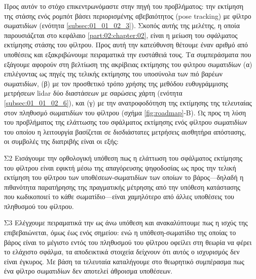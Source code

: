 Προς αυτόν το στόχο επικεντρωνόμαστε στην πηγή του προβλήματος: την εκτίμηση
της στάσης ενός ρομπότ βάσει περιορισμένης αβεβαιότητος (pose tracking) με
φίλτρο σωματιδίων (ενότητα \ref{subsec:01_01_02_3}). Σκοπός αυτής της μελέτης, η
οποία παρουσιάζεται στο κεφάλαιο \ref{part:02:chapter:02}, είναι η μείωση του
σφάλματος εκτίμησης στάσης του φίλτρου. Προς αυτή την κατεύθυνση θέτουμε έναν
αριθμό από υποθέσεις και εξακριβώνουμε πειραματικά την ευστάθειά τους. Τα
συμπεράσματα που εξάγουμε αφορούν στη βελτίωση της ακρίβειας εκτίμησης του
φιλτρου σωματιδίων (α) επιλέγοντας ως πηγές της τελικής εκτίμησης του υποσύνολα
των πιό βαρέων σωματιδίων, (β) με τον προσθετικό τρόπο χρήσης της μεθόδου
ευθυγράμμισης μετρήσεων lidar δύο διαστάσεων με σαρώσεις χάρτη (ενότητα
\ref{subsec:01_01_02_6}), και (γ) με την ανατροφοδότηση της εκτίμησης της
τελευταίας στον πληθυσμό σωματιδίων του φίλτρου (σχήμα \ref{fig:roadmap}-Β). Ως
προς τη λύση του προβλήματος της ελάττωσης του σφάλματος εκτίμησης ενός φίλτρου
σωματιδίων του οποίου η λειτουργία βασίζεται σε δισδιάστατες μετρήσεις
αισθητήρα απόστασης, οι συμβολές της διατριβής είναι οι εξής:

\begin{bw_box}
\begin{customcontribution}{Σ2}
  \label{contribution:02}
  Εισάγουμε την ορθολογική υπόθεση πως η ελάττωση του σφάλματος εκτίμησης του
  φίλτρου είναι εφικτή μέσω της απαγόρευσης ψηφοδοσίας ως προς την τελική
  εκτίμηση του φίλτρου των υποθέσεων-σωματιδίων των οποίων το βάρος---δηλαδή η
  πιθανότητα παρατήρησης της πραγματικής μέτρησης από την υπόθεση κατάστασης
  που κωδικοποιεί το κάθε σωματίδιο---είναι χαμηλότερο από άλλες υποθέσεις του
  πληθυσμού του φίλτρου. \cite{Filotheou2020c}
\end{customcontribution}
\end{bw_box}

\begin{bw_box}
\begin{customcontribution}{Σ3}
  \label{contribution:03}
  Ελέγχουμε πειραματικά την ως άνω υπόθεση και ανακαλύπτουμε πως η ισχύς της
  επιβεβαιώνεται, όμως έως ενός σημείου: ενώ η υπόθεση-σωματίδιο της οποίας το
  βάρος είναι το μέγιστο εντός του πληθυσμού του φίλτρου οφείλει στη θεωρία να
  φέρει το ελάχιστο σφάλμα, τα αποδεικτικά στοιχεία δείχνουν ότι αυτός ο
  ισχυρισμός δεν είναι έγκυρος. Με βάση τα τελευταία καταλήγουμε στο θεωρητικό
  συμπέρασμα πως ένα φίλτρο σωματιδίων δεν αποτελεί άθροισμα υποθέσεων.
\end{customcontribution}
\end{bw_box}


